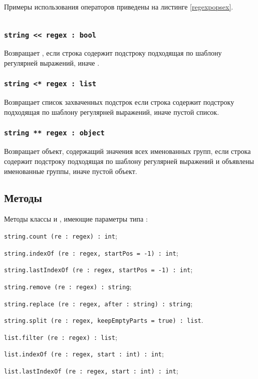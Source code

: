 Примеры использования операторов приведены на листинге \ref{regexpopsex}.

\begin{sourcecode}
	\label{regexpopsex}
    \inputminted[linenos]{icl}{../sources/regexpopsex.icL}
\end{sourcecode}

\subsubsection{\texttt{string << regex : bool}}

Возвращает \true{}, если строка содержит подстроку подходящая по шаблону регулярней выражений, иначе \false{}.

\subsubsection{\texttt{string <* regex : list}}

Возвращает список захваченных подстрок если строка содержит подстроку подходящая по шаблону регулярней выражений, иначе пустой список.

\subsubsection{\texttt{string ** regex : object}}

Возвращает объект, содержащий значения всех именованных групп, если строка содержит подстроку подходящая по шаблону регулярней выражений и объявлены именованные группы, иначе пустой объект.


\subsection{Методы}

Методы классы \str{} и \listtype, имеющие параметры типа \regex{}:
\begin{icItems}
\item
	\texttt{string.count (re : regex) : int};
\item
	\texttt{string.indexOf (re : regex, startPos = -1) : int};
\item
	\texttt{string.lastIndexOf (re : regex, startPos = -1) : int};
\item
	\texttt{string.remove (re : regex) : string};
\item 
	\texttt{string.replace (re : regex, after : string) : string};
\item
	\texttt{string.split (re : regex, keepEmptyParts = true) : list}.
\item
	\texttt{list.filter (re : regex) : list};
\item
	\texttt{list.indexOf (re : regex, start : int) : int};
\item
	\texttt{list.lastIndexOf (re : regex, start : int) : int};
\end{icItems}

